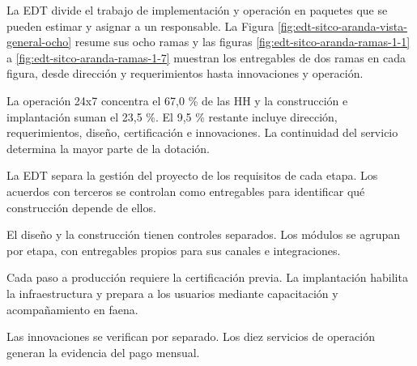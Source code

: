 \documentclass[formulario]{../../comun/overfore}
\begin{document}
La EDT divide el trabajo de implementación y operación en paquetes que se pueden estimar y asignar a un responsable. La Figura \ref{fig:edt-sitco-aranda-vista-general-ocho} resume sus ocho ramas y las figuras \ref{fig:edt-sitco-aranda-ramas-1-1} a \ref{fig:edt-sitco-aranda-ramas-1-7} muestran los entregables de dos ramas en cada figura, desde dirección y requerimientos hasta innovaciones y operación.

La operación 24x7 concentra el 67,0 \% de las HH y la construcción e implantación suman el 23,5 \%. El 9,5 \% restante incluye dirección, requerimientos, diseño, certificación e innovaciones. La continuidad del servicio determina la mayor parte de la dotación.

La EDT separa la gestión del proyecto de los requisitos de cada etapa. Los acuerdos con terceros se controlan como entregables para identificar qué construcción depende de ellos.

El diseño y la construcción tienen controles separados. Los módulos se agrupan por etapa, con entregables propios para sus canales e integraciones.

Cada paso a producción requiere la certificación previa. La implantación habilita la infraestructura y prepara a los usuarios mediante capacitación y acompañamiento en faena.

Las innovaciones se verifican por separado. Los diez servicios de operación generan la evidencia del pago mensual.
\end{document}
